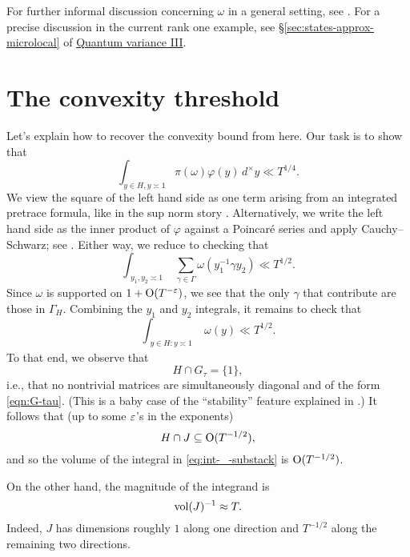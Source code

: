 \documentclass[reqno]{amsart} 
\numberwithin{equation}{section}
\begin{document}
For further informal discussion concerning $\omega$ in a general setting, see \cite[\S2]{2020arXiv201202187N}.  For a precise discussion in the current rank one example, see \S\ref{sec:states-approx-microlocal} of \href{var-quat-3-submitted.pdf}{Quantum variance III}.


\section{The convexity threshold}\label{sec:org82a14f5}
Let's explain how to recover the convexity bound from here.  Our task is to show that
\begin{equation*}
  \int _{y \in H, y \asymp 1} \pi(\omega) \varphi(y) \, d^\times y \ll T^{1/4}.
\end{equation*}
We view the square of the left hand side as one term arising from an integrated pretrace formula, like in the sup norm story \cite{iwan-sar}.  Alternatively, we write the left hand side as the inner product of $\varphi$ against a Poincar{\'e} series and apply Cauchy--Schwarz; see \cite[\S5.3]{2020arXiv201202187N}.  Either way, we reduce to checking that
\begin{equation}\label{eq:int-_-substack-1}
  \int _{
    \substack{
      y_1, y_2 \asymp 1
    }
  }
  \sum _{\gamma \in \Gamma }
  \omega (y_1^{-1} \gamma y_2)
  \ll
  T^{1/2}.
\end{equation}
Since $\omega$ is supported on $1 + \operatorname{O}(T^{-\varepsilon})$, we see that the only $\gamma$ that contribute are those in $\Gamma_{H}$.  Combining the $y_1$ and $y_2$ integrals, it remains to check that
\begin{equation}\label{eq:int-_-substack}
  \int _{
    \substack{
      y \in H : y\asymp 1
    }
  }
  \omega (y)
  \ll
  T^{1/2}.
\end{equation}
To that end, we observe that
\begin{equation*}
  H \cap G_\tau = \{1\},
\end{equation*}
i.e., that no nontrivial matrices are simultaneously diagonal and of the form \eqref{eqn:G-tau}.  (This is a baby case of the ``stability'' feature explained in \cite[\S1.9, \S14]{nelson-venkatesh-1}.)  It follows that (up to some $\varepsilon$'s in the exponents)
\begin{equation*}
  H \cap J \subseteq \operatorname{O}(T^{-1/2}),
\end{equation*}
and so the volume of the integral in  \eqref{eq:int-_-substack} is $\operatorname{O}(T^{-1/2})$.

On the other hand, the magnitude of the integrand is
\begin{equation*}
  \operatorname{vol}(J)^{-1} \approx T.
\end{equation*}
Indeed, $J$ has dimensions roughly $1$ along one direction and $T^{-1/2}$ along the remaining two directions.
\end{document}
